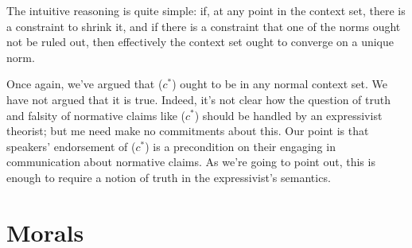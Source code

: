 \documentclass[11pt,article,oneside]{memoir}
\begin{document}
The intuitive reasoning is quite simple: if, at any point in the context set, there is a constraint to shrink it, 
and if there is a constraint that one of the norms ought not be ruled out, then effectively the context set ought to converge on a unique norm. 

Once again, we've argued that ($c^*$) ought to be in any normal context set. We have not argued that it is true. Indeed, it's not clear how the question of truth and falsity of normative claims like ($c^*$) should be handled by an expressivist theorist; but me need make no commitments about this. Our point is that speakers' endorsement of ($c^*$) is a precondition on their engaging in communication about normative claims. As we're going to point out, this is enough to require a notion of truth in the expressivist's semantics. 


\section{Morals}\label{dragon}

 

\printbibliography
\end{document}
